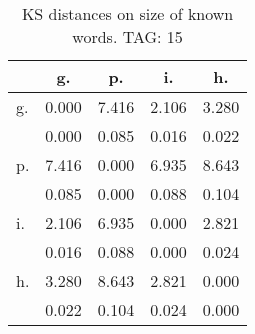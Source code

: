 \begin{table}[h!]
\begin{center}
\begin{tabular}{| l | c | c | c | c |}\hline
 & g. & p. & i. & h. \\\hline
g. & 0.000  & 7.416  & 2.106  & 3.280 \\\hline
 & 0.000  & 0.085  & 0.016  & 0.022 \\\hline
p. & 7.416  & 0.000  & 6.935  & 8.643 \\\hline
 & 0.085  & 0.000  & 0.088  & 0.104 \\\hline
i. & 2.106  & 6.935  & 0.000  & 2.821 \\\hline
 & 0.016  & 0.088  & 0.000  & 0.024 \\\hline
h. & 3.280  & 8.643  & 2.821  & 0.000 \\\hline
 & 0.022  & 0.104  & 0.024  & 0.000 \\\hline
\end{tabular}
\caption{KS distances on size of known words. TAG: 15}
\end{center}
\end{table}